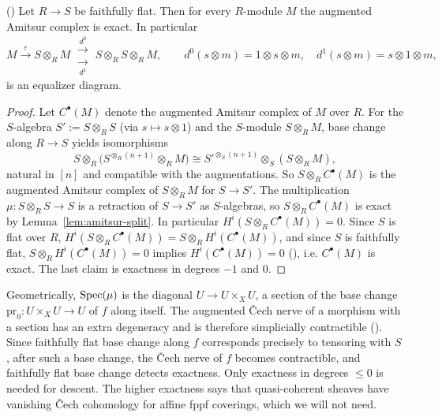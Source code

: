 \begin{theorem}[Amitsur]\label{thm:amitsur}
	(\cite[][Lemma~35.3.6, Tag 023M]{stacks-project})
	Let $R\to S$ be faithfully flat. Then for every $R$-module $M$ the augmented Amitsur complex is exact. In particular
	\[
	M\xrightarrow{\ \varepsilon\ }S\otimes_RM\ \substack{\xrightarrow{\ d^0\ }\\[-0.2em]\xrightarrow[\ d^1\ ]{}}\ S\otimes_RS\otimes_RM,\qquad d^0(s\otimes m)=1\otimes s\otimes m,\quad d^1(s\otimes m)=s\otimes1\otimes m,
	\]
	is an equalizer diagram.
\end{theorem}

\begin{proof}
	Let $C^\bullet(M)$ denote the augmented Amitsur complex of $M$ over $R$. For the $S$-algebra $S':=S\otimes_RS$ (via $s\mapsto s\otimes1$) and the $S$-module $S\otimes_RM$, base change along $R\to S$ yields isomorphisms
	\[
	S\otimes_R\bigl(S^{\otimes_R(n+1)}\otimes_RM\bigr)\cong S'^{\otimes_S(n+1)}\otimes_S(S\otimes_RM),
	\]
	natural in $[n]$ and compatible with the augmentations. So $S\otimes_RC^\bullet(M)$ is the augmented Amitsur complex of $S\otimes_RM$ for $S\to S'$. The multiplication $\mu:S\otimes_RS\to S$ is a retraction of $S\to S'$ as $S$-algebras, so $S\otimes_RC^\bullet(M)$ is exact by Lemma~\ref{lem:amitsur-split}. In particular $H^i(S\otimes_R C^\bullet(M)) = 0$. Since $S$ is flat over $R$, $H^i(S\otimes_RC^\bullet(M))=S\otimes_RH^i(C^\bullet(M))$, and since $S$ is faithfully flat, $S\otimes_RH^i(C^\bullet(M))=0$ implies $H^i(C^\bullet(M))=0$ (\cite[][Tag 00HP]{stacks-project}), i.e. $C^\bullet(M)$ is exact. The last claim is exactness in degrees $-1$ and $0$.
\end{proof}

\begin{remark}\label{rem:amitsur-homotopical}
	Geometrically, $\operatorname{Spec}\!\left(\mu\right)$ is the diagonal $U\to U\times_XU$, a section of the base change $\mathrm{pr}_0:U\times_XU\to U$ of $f$ along itself. The augmented \v{C}ech nerve of a morphism with a section has an extra degeneracy and is therefore simplicially contractible (\cite[][Tag 019Z]{stacks-project}). Since faithfully flat base change along $f$ corresponds precisely to tensoring with $S$, after such a base change, the \v{C}ech nerve of $f$ becomes contractible, and faithfully flat base change detects exactness. Only exactness in degrees $\le0$ is needed for descent. The higher exactness says that quasi-coherent sheaves have vanishing \v{C}ech cohomology for affine fppf coverings, which we will not need.
\end{remark}


